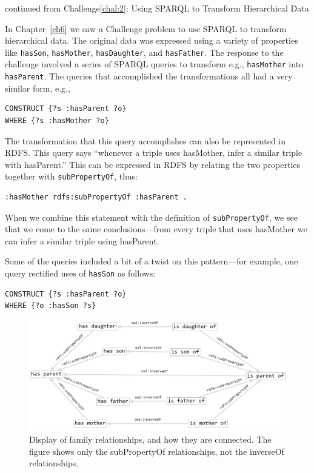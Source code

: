 \begin{challenge}{continued from Challenge\protect\ref{chal:2}: Using SPARQL to Transform Hierarchical Data}

In Chapter~\ref{ch6} we saw a Challenge problem to use SPARQL to transform
hierarchical data. The original data was expressed using a variety of
properties like \texttt{hasSon}, \texttt{hasMother}, \texttt{hasDaughter}, and \texttt{hasFather}. The
response to the challenge involved a series of SPARQL queries to
transform e.g., \texttt{hasMother} into \texttt{hasParent}. The queries that accomplished
the transformations all had a very similar form, e.g.,

\begin{lstlisting}
CONSTRUCT {?s :hasParent ?o}
WHERE {?s :hasMother ?o}
\end{lstlisting}


The transformation that this query accomplishes can also be represented
in RDFS. This query says ``whenever a triple uses hasMother, infer a
similar triple with hasParent.'' This can be expressed in RDFS by
relating the two properties together with \texttt{subPropertyOf}, thus:

\begin{lstlisting}
:hasMother rdfs:subPropertyOf :hasParent .
\end{lstlisting}

When we combine this statement with the definition of \texttt{subPropertyOf}, we
see that we come to the same conclusions---from every triple that uses
hasMother we can infer a similar triple using hasParent.

Some of the queries included a bit of a twist on this pattern---for
example, one query rectified uses of
\texttt{hasSon} as follows:

\begin{lstlisting}
CONSTRUCT {?s :hasParent ?o}
WHERE {?o :hasSon ?s}
\end{lstlisting}



\begin{figure}
\centering
\includegraphics[width=5in]{SWWOv3/media/ch9/figure9-1.png}
\caption{Display of family relationships, and how they are connected. The figure shows only the
subPropertyOf relationships, not the inverseOf relationships.}
\label{fig:ch9.1}
\end{figure}





\end{challenge}

